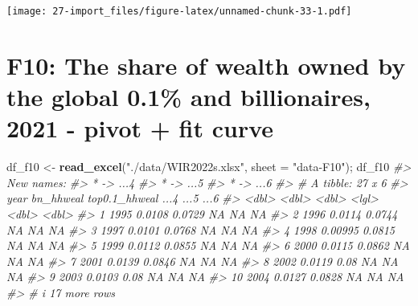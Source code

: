 \documentclass[
  xelatex, ja=standard]{bxjsbook}
\newenvironment{Shaded}{\begin{snugshade}}{\end{snugshade}}
\newcommand{\AttributeTok}[1]{\textcolor[rgb]{0.13,0.29,0.53}{#1}}
\newcommand{\CommentTok}[1]{\textcolor[rgb]{0.56,0.35,0.01}{\textit{#1}}}
\newcommand{\FunctionTok}[1]{\textcolor[rgb]{0.13,0.29,0.53}{\textbf{#1}}}
\newcommand{\NormalTok}[1]{#1}
\newcommand{\OtherTok}[1]{\textcolor[rgb]{0.56,0.35,0.01}{#1}}
\newcommand{\StringTok}[1]{\textcolor[rgb]{0.31,0.60,0.02}{#1}}
\theoremstyle{definition}
\theoremstyle{definition}
\theoremstyle{definition}
\theoremstyle{definition}
\theoremstyle{remark}
\begin{document}
\texttt{[image: 27-import\_files/figure-latex/unnamed-chunk-33-1.pdf]}

\hypertarget{f10-the-share-of-wealth-owned-by-the-global-0.1-and-billionaires-2021---pivot-fit-curve}{%
\section{F10: The share of wealth owned by the global 0.1\% and billionaires, 2021 - pivot + fit curve}\label{f10-the-share-of-wealth-owned-by-the-global-0.1-and-billionaires-2021---pivot-fit-curve}}

\begin{Shaded}
\begin{Highlighting}[]
\NormalTok{df\_f10 }\OtherTok{\textless{}{-}} \FunctionTok{read\_excel}\NormalTok{(}\StringTok{"./data/WIR2022s.xlsx"}\NormalTok{, }\AttributeTok{sheet =} \StringTok{"data{-}F10"}\NormalTok{); df\_f10}
\CommentTok{\#\textgreater{} New names:}
\CommentTok{\#\textgreater{} * \textasciigrave{}\textasciigrave{} {-}\textgreater{} \textasciigrave{}...4\textasciigrave{}}
\CommentTok{\#\textgreater{} * \textasciigrave{}\textasciigrave{} {-}\textgreater{} \textasciigrave{}...5\textasciigrave{}}
\CommentTok{\#\textgreater{} * \textasciigrave{}\textasciigrave{} {-}\textgreater{} \textasciigrave{}...6\textasciigrave{}}
\CommentTok{\#\textgreater{} \# A tibble: 27 x 6}
\CommentTok{\#\textgreater{}     year bn\_hhweal top0.1\_hhweal ...4   ...5  ...6}
\CommentTok{\#\textgreater{}    \textless{}dbl\textgreater{}     \textless{}dbl\textgreater{}         \textless{}dbl\textgreater{} \textless{}lgl\textgreater{} \textless{}dbl\textgreater{} \textless{}dbl\textgreater{}}
\CommentTok{\#\textgreater{}  1  1995   0.0108         0.0729 NA       NA    NA}
\CommentTok{\#\textgreater{}  2  1996   0.0114         0.0744 NA       NA    NA}
\CommentTok{\#\textgreater{}  3  1997   0.0101         0.0768 NA       NA    NA}
\CommentTok{\#\textgreater{}  4  1998   0.00995        0.0815 NA       NA    NA}
\CommentTok{\#\textgreater{}  5  1999   0.0112         0.0855 NA       NA    NA}
\CommentTok{\#\textgreater{}  6  2000   0.0115         0.0862 NA       NA    NA}
\CommentTok{\#\textgreater{}  7  2001   0.0139         0.0846 NA       NA    NA}
\CommentTok{\#\textgreater{}  8  2002   0.0119         0.08   NA       NA    NA}
\CommentTok{\#\textgreater{}  9  2003   0.0103         0.08   NA       NA    NA}
\CommentTok{\#\textgreater{} 10  2004   0.0127         0.0828 NA       NA    NA}
\CommentTok{\#\textgreater{} \# i 17 more rows}
\end{Highlighting}
\end{Shaded}
\end{document}
